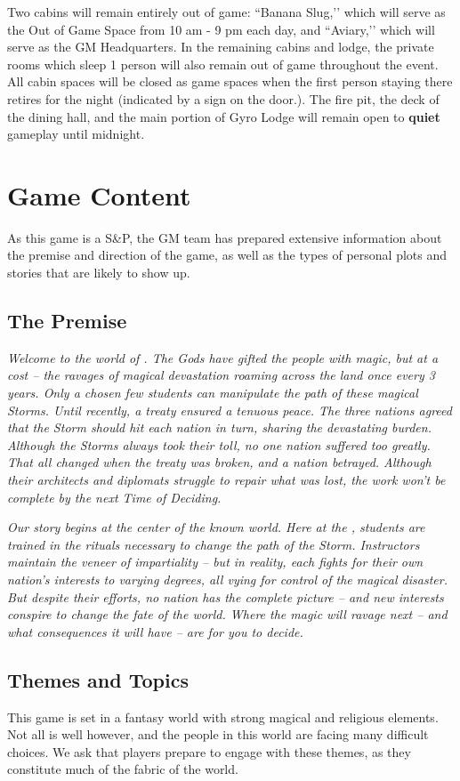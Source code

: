 \documentclass[sheet]{GL2020}
\begin{document}
Two cabins will remain entirely out of game: ``Banana Slug,’’ which will serve as the Out of Game Space from 10 am - 9 pm each day, and ``Aviary,’’ which will serve as the GM Headquarters. In the remaining cabins and lodge, the private rooms which sleep 1 person will also remain out of game throughout the event. All cabin spaces will be closed as game spaces when the first person staying there retires for the night (indicated by a sign on the door.). The fire pit, the deck of the dining hall, and the main portion of Gyro Lodge will remain open to \textbf{quiet} gameplay until midnight.

\section{Game Content}
As this game is a S\&P, the GM team has prepared extensive information about the premise and direction of the game, as well as the types of personal plots and stories that are likely to show up.

\subsection{The Premise}
\emph{Welcome to the world of \pEarth{}. The Gods have gifted the people with magic, but at a cost -- the ravages of magical devastation roaming across the land once every 3 years. Only a chosen few students can manipulate the path of these magical Storms. Until recently, a treaty ensured a tenuous peace. The three nations agreed that the Storm should hit each nation in turn, sharing the devastating burden. Although the Storms always took their toll, no one nation suffered too greatly. That all changed when the treaty was broken, and a nation betrayed. Although their architects and diplomats struggle to repair what was lost, the work won’t be complete by the next Time of Deciding.}

\emph{Our story begins at the center of the known world. Here at the \pSchool{}, students are trained in the rituals necessary to change the path of the Storm. Instructors maintain the veneer of impartiality -- but in reality, each fights for their own nation’s interests to varying degrees, all vying for control of the magical disaster. But despite their efforts, no nation has the complete picture -- and new interests conspire to change the fate of the world. Where the magic will ravage next -- and what consequences it will have -- are for you to decide.}

\subsection{Themes and Topics}
This game is set in a fantasy world with strong magical and religious elements. Not all is well however, and the people in this world are facing many difficult choices. We ask that players prepare to engage with these themes, as they constitute much of the fabric of the world.
\end{document}
